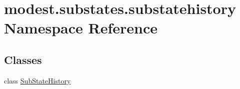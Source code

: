 \hypertarget{namespacemodest_1_1substates_1_1substatehistory}{}\section{modest.\+substates.\+substatehistory Namespace Reference}
\label{namespacemodest_1_1substates_1_1substatehistory}
\subsection*{Classes}
\begin{DoxyCompactItemize}
\item 
class \hyperlink{classmodest_1_1substates_1_1substatehistory_1_1SubStateHistory}{Sub\+State\+History}
\end{DoxyCompactItemize}
